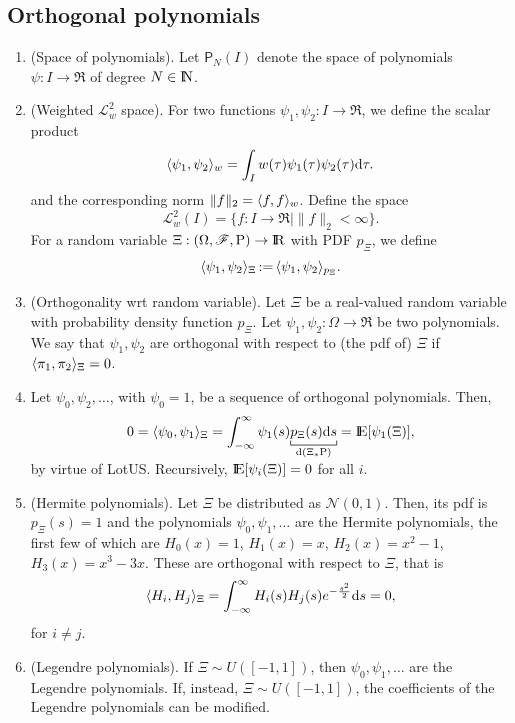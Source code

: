\documentclass[a4paper,10pt]{article}
\begin{document}
\subsection{Orthogonal polynomials}
\begin{enumerate}
 \item (Space of polynomials). Let \(\mathsf{P}_N(I)\) denote the space of polynomials \(\psi:I\to\Re\) of degree
       \(N\in\N\). 
 \item (Weighted \(\mathcal{L}^2_w\) space). For two functions \(\psi_1,\psi_2:I\to\Re\), we define the scalar product
       \[
        \langle\psi_1, \psi_2\rangle_{w} = \int_{I}w(\tau) \psi_1(\tau) \psi_2(\tau) \mathrm{d} \tau.
       \]
       and the corresponding norm \(\|f\|_2 = \langle f,f\rangle_w\). Define the space
       \[
        \mathcal{L}^2_w(I) = \{f:I\to\Re \mid \|f\|_2 < \infty\}.
       \]
       For a random variable \(\Xi:\ofp\to\Re\) with PDF \(p_\Xi\), we define 
       \[
        \langle\psi_1, \psi_2\rangle_{\Xi} {}{}\mathop{\mathrel{:}=}{}{} \langle\psi_1, \psi_2\rangle_{p_{\Xi}}.
       \]

 \item (Orthogonality wrt random variable). Let $\Xi$ be a real-valued random variable with 
       probability density function $p_\Xi$. Let \(\psi_1,\psi_2:\Omega\to\Re\) be two polynomials.        
       We say that \(\psi_1,\psi_2\) are orthogonal with respect to (the pdf of) \(\Xi\) if 
       \(\langle\pi_1, \pi_2\rangle_{\Xi} = 0\).
 \item Let \(\psi_0, \psi_2,\ldots\), with \(\psi_0=1\), be a sequence of orthogonal polynomials.
       Then,
       \[
        0 = \< \psi_0, \psi_1 \>_\Xi
          = \int_{-\infty}^{\infty} \psi_{1}(s) 
          \smashunderbracket{p_{\Xi}(s) \d s}{\d (\Xi_* \prob)}
          = \E[\psi_1(\Xi)],
       \]
       by virtue of LotUS. Recursively, \(\E[\psi_i(\Xi)] = 0\) for all \(i\).
       
 \item (Hermite polynomials). Let \(\Xi\) be distributed as \(\mathcal{N}(0,1)\).
       Then, its pdf is \(p_{\Xi}(s) = 1\) and the polynomials \(\psi_0,\psi_1,\ldots\) are the 
       Hermite polynomials, the first few of which are \(H_0(x)=1\), \(H_1(x)=x\), \(H_2(x)=x^2-1\),
       \(H_3(x) = x^3 - 3x\). These are orthogonal with respect to \(\Xi\), that is
       \[
        \langle H_i, H_j\rangle_\Xi = \int_{-\infty}^{\infty}H_i(s) H_j(s) e^{-\frac{s^2}{2}}\mathrm{d} s = 0,
       \]
       for \(i\neq j\).

       
 \item (Legendre polynomials). If \(\Xi\sim U([-1,1])\), then \(\psi_0,\psi_1,\ldots\) are the 
        Legendre polynomials. If, instead, \(\Xi\sim U([-1,1])\), the coefficients of the 
        Legendre polynomials can be modified.
        

\end{enumerate}
\end{document}

